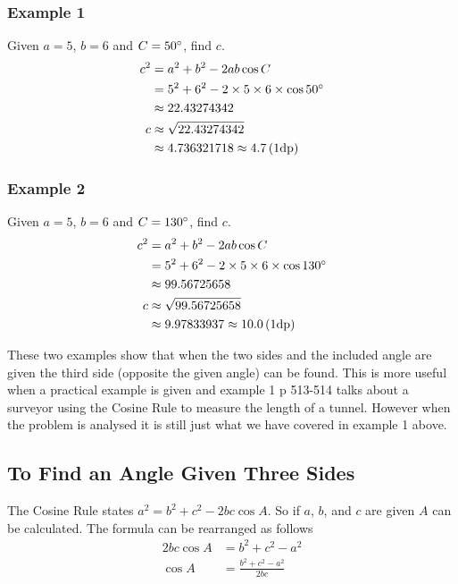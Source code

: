 \subsubsection{Example 1}
Given $a =5$, $b =6$ and $C =50 \mbox{{\ensuremath{{}^\circ}}}$, find $c$.
\begin{align*}c^{2} &  = a^{2} +b^{2} -2 a b \cos  C \\
 &  = 5^{2} +6^{2} -2 \times 5 \times 6 \times \cos  50 \mbox{{\ensuremath{{}^\circ}}} \\
 &  \approx   22.43274342 \\
c &  \approx   \sqrt{22.43274342} \\
 &  \approx   4.736321718 \approx 4.7 \left (1\text{dp}\right )\end{align*}

\subsubsection{Example 2}
Given $a =5$, $b =6$ and $C =130 \mbox{{\ensuremath{{}^\circ}}}$, find $c$.
\begin{align*}c^{2} &  = a^{2} +b^{2} -2 a b \cos  C \\
 &  = 5^{2} +6^{2} -2 \times 5 \times 6 \times \cos  130 \mbox{{\ensuremath{{}^\circ}}} \\
 &  \approx   99.56725658 \\
c &  \approx   \sqrt{99.56725658} \\
 &  \approx   9.97833937 \approx 10.0 \left (1\text{dp}\right )\end{align*}

These two examples show that when the two sides and the included angle are given the third side
(opposite the given angle) can be found. This is more useful when a practical example is given and example 1
p 513-514 talks about a surveyor using the Cosine Rule to measure the length of a tunnel. However when the problem
is analysed it is still just what we have covered in example 1 above. 

\subsection{To Find an Angle Given Three Sides}
The Cosine Rule states $a^{2} =b^{2} +c^{2} -2 b c \cos  A\text{.}$ So if $a$, $b$, and $c$ are given $A$ can be calculated. The formula can be rearranged as follows
\begin{align*}2 b c \cos  A &  = b^{2} +c^{2} -a^{2} \\
\cos  A &  = \frac{b^{2} +c^{2} -a^{2}}{2 b c}\end{align*}


